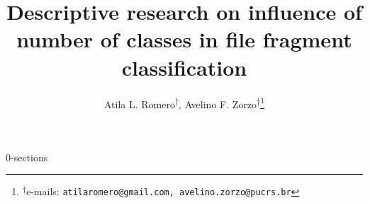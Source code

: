 \documentclass[english,oneside]{article}
\author{Atila L. Romero\textsuperscript{$\dagger$}, Avelino F. Zorzo\textsuperscript{$\dagger$}{\let\thefootnote\relax\footnote{{\textsuperscript{$\dagger$}e-mails: \texttt{atilaromero@gmail.com, avelino.zorzo@pucrs.br}}}}}
\title{Descriptive research on influence of number of classes in file fragment classification}
\date{}
\begin{document}
\maketitle




{0-sections}

% 
%


\end{document}
